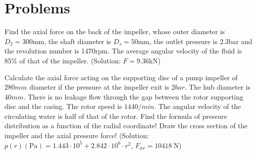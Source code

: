 \section{Problems}


Find the axial force on the back of the impeller, whose outer diameter is $D_2=300$mm, the shaft diameter is $D_s=50$mm, the outlet pressure is $2.3$bar and the revolution number is 1470rpm. The average angular velocity of the fluid is 85\% of that of the impeller. (Solution: $F=9.36$kN)


\vspace{1cm}

Calculate the axial force acting on the supporting disc of a pump impeller of $280 mm$ diameter if the pressure at the impeller exit is $2 bar$. The hub diameter is $40 mm$. There is no leakage flow through the gap between the rotor supporting disc and the casing. The rotor speed is $1440/min$. The angular velocity of the circulating water is half of that of the rotor. Find the formula of pressure distribution as a function of the radial coordinate! Draw the cross section of the impeller and the axial pressure force! (Solution: $p(r)(\mathrm{Pa}) = 1.443\cdot 10^5 + 2.842\cdot 10^6 \cdot r^2$, $F_{ax} = 10418~\mathrm{N}$)